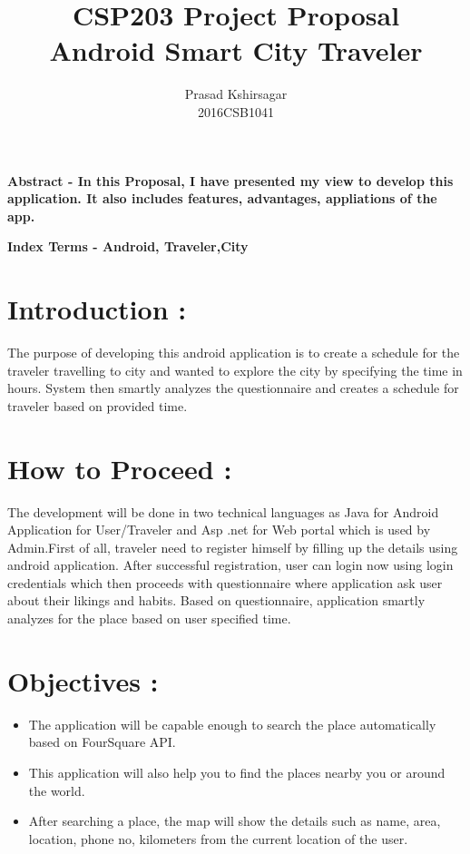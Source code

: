 \documentclass[12pt]{IEEEtran}
\begin{document}
\title{\bf CSP203 Project Proposal \\
            Android Smart City Traveler}

\author{

Prasad Kshirsagar\\
2016CSB1041

}


\maketitle
\textbf{ Abstract - In this Proposal, I have presented my view to develop this application. It also includes features, advantages, appliations of the app.}\\ \hfill \break 
 

\textbf{
Index Terms - Android, Traveler,City
}


 \section{Introduction :}
  The purpose of developing this android application is to create a schedule for the traveler travelling to city and wanted to explore the city by specifying the time in hours. System then smartly analyzes the questionnaire and creates a schedule for traveler based on provided time.\\ \hfill \break 
  
  
 \section{How to Proceed :}
  The development will be done in two technical languages as Java for Android Application for User/Traveler and Asp .net for Web portal which is used by Admin.First of all, traveler need to register himself by filling up the details using android application. After successful registration, user can login now using login credentials which then proceeds with questionnaire where application ask user about their likings and habits. Based on questionnaire, application smartly analyzes for the place based on user specified time.\\ 

\section{Objectives :}
   \begin{itemize}
  \item The application will be capable enough to search the place automatically based on FourSquare API.
  \item This application will also help you to find the places nearby you or around the world.
  \item After searching a place, the map will show the details such as name, area, location, phone no, kilometers from the current location of the user.
  \end{itemize} \hfill \break
  
\end{document}
